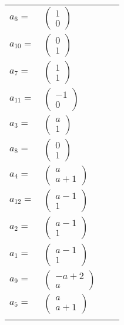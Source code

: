 \documentclass[1p]{elsarticle_modified}
\theoremstyle{definition}
\begin{document}
\begin{tabular}{m{7pt} m{180pt} m{7pt} m{180pt} }
\flushright $a_{6}=$&$\begin{pmatrix}1\\0\end{pmatrix}$ \\
\flushright $a_{10}=$&$\begin{pmatrix}0\\1\end{pmatrix}$ \\
\flushright $a_{7}=$&$\begin{pmatrix}1\\1\end{pmatrix}$ \\
\flushright $a_{11}=$&$\begin{pmatrix}-1\\0\end{pmatrix}$ \\
\flushright $a_{3}=$&$\begin{pmatrix}a\\1\end{pmatrix}$ \\
\flushright $a_{8}=$&$\begin{pmatrix}0\\1\end{pmatrix}$ \\
\flushright $a_{4}=$&$\begin{pmatrix}a\\a+1\end{pmatrix}$ \\
\flushright $a_{12}=$&$\begin{pmatrix}a-1\\1\end{pmatrix}$ \\
\flushright $a_{2}=$&$\begin{pmatrix}a-1\\1\end{pmatrix}$ \\
\flushright $a_{1}=$&$\begin{pmatrix}a-1\\1\end{pmatrix}$ \\
\flushright $a_{9}=$&$\begin{pmatrix}- a+2\\a\end{pmatrix}$ \\
\flushright $a_{5}=$&$\begin{pmatrix}a\\a+1\end{pmatrix}$\\&\end{tabular}
\end{document}
